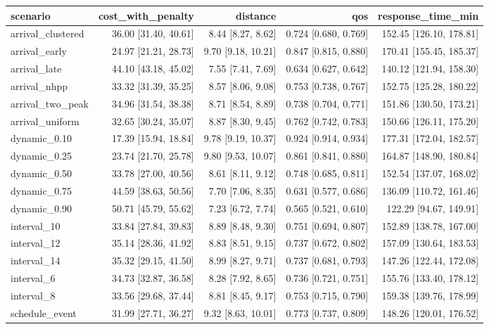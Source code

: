 \begin{tabular}{lrrrr}
\toprule
scenario & cost\_with\_penalty & distance & qos & response\_time\_min \\
\midrule
arrival\_clustered & 36.00 [31.40, 40.61] & 8.44 [8.27, 8.62] & 0.724 [0.680, 0.769] & 152.45 [126.10, 178.81] \\
arrival\_early & 24.97 [21.21, 28.73] & 9.70 [9.18, 10.21] & 0.847 [0.815, 0.880] & 170.41 [155.45, 185.37] \\
arrival\_late & 44.10 [43.18, 45.02] & 7.55 [7.41, 7.69] & 0.634 [0.627, 0.642] & 140.12 [121.94, 158.30] \\
arrival\_nhpp & 33.32 [31.39, 35.25] & 8.57 [8.06, 9.08] & 0.753 [0.738, 0.767] & 152.75 [125.28, 180.22] \\
arrival\_two\_peak & 34.96 [31.54, 38.38] & 8.71 [8.54, 8.89] & 0.738 [0.704, 0.771] & 151.86 [130.50, 173.21] \\
arrival\_uniform & 32.65 [30.24, 35.07] & 8.87 [8.30, 9.45] & 0.762 [0.742, 0.783] & 150.66 [126.11, 175.20] \\
dynamic\_0.10 & 17.39 [15.94, 18.84] & 9.78 [9.19, 10.37] & 0.924 [0.914, 0.934] & 177.31 [172.04, 182.57] \\
dynamic\_0.25 & 23.74 [21.70, 25.78] & 9.80 [9.53, 10.07] & 0.861 [0.841, 0.880] & 164.87 [148.90, 180.84] \\
dynamic\_0.50 & 33.78 [27.00, 40.56] & 8.61 [8.11, 9.12] & 0.748 [0.685, 0.811] & 152.54 [137.07, 168.02] \\
dynamic\_0.75 & 44.59 [38.63, 50.56] & 7.70 [7.06, 8.35] & 0.631 [0.577, 0.686] & 136.09 [110.72, 161.46] \\
dynamic\_0.90 & 50.71 [45.79, 55.62] & 7.23 [6.72, 7.74] & 0.565 [0.521, 0.610] & 122.29 [94.67, 149.91] \\
interval\_10 & 33.84 [27.84, 39.83] & 8.89 [8.48, 9.30] & 0.751 [0.694, 0.807] & 152.89 [138.78, 167.00] \\
interval\_12 & 35.14 [28.36, 41.92] & 8.83 [8.51, 9.15] & 0.737 [0.672, 0.802] & 157.09 [130.64, 183.53] \\
interval\_14 & 35.32 [29.15, 41.50] & 8.99 [8.27, 9.71] & 0.737 [0.681, 0.793] & 147.26 [122.44, 172.08] \\
interval\_6 & 34.73 [32.87, 36.58] & 8.28 [7.92, 8.65] & 0.736 [0.721, 0.751] & 155.76 [133.40, 178.12] \\
interval\_8 & 33.56 [29.68, 37.44] & 8.81 [8.45, 9.17] & 0.753 [0.715, 0.790] & 159.38 [139.76, 178.99] \\
schedule\_event & 31.99 [27.71, 36.27] & 9.32 [8.63, 10.01] & 0.773 [0.737, 0.809] & 148.26 [120.01, 176.52] \\

\end{tabular}
